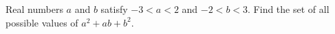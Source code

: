 Real numbers $a$ and $b$ satisfy $-3<a<2$ and $-2<b<3$. Find the set of all possible values of $a^2+ab+b^2$.
